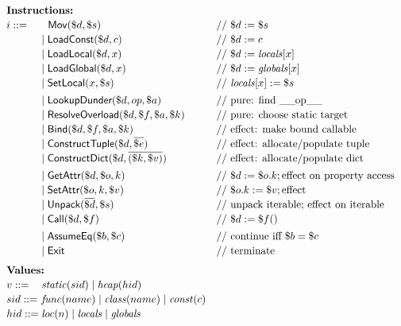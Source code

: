 \begin{figure}[t]
\centering
\[
\renewcommand{\arraystretch}{1.15}
\begin{array}{l@{}ll}
\multicolumn{3}{l}{\textbf{Instructions:}}\\
i ::= \;&\hspace{6pt}\mathsf{Mov}(\$d,\$s) & \text{// } \$d := \$s \\
      &\mid \tLoadConst(\$d,c) & \text{// } \$d := c \\
      &\mid \tLoadLocal(\$d,x) & \text{// } \$d := \mathit{locals}[x] \\
      &\mid \tLoadGlobal(\$d,x) & \text{// } \$d := \mathit{globals}[x] \\
      &\mid \tSetLocal(x,\$s) & \text{// } \mathit{locals}[x] := \$s \\[0.6ex]
      &\mid \tLookupDunder(\$d,op,\$a)  & \text{// pure: find \_\_op\_\_} \\
      &\mid \tResolveOverload(\$d,\$f,\$a,\$k) & \text{// pure: choose static target} \\
      &\mid \tBind(\$d,\$f,\$a,\$k) & \text{// effect: make bound callable} \\
      &\mid \tConstructTuple(\$d,\overline{\$e}) & \text{// effect: allocate/populate tuple} \\
      &\mid \tConstructDict(\$d,\overline{(\$k,\$v)}) & \text{// effect: allocate/populate dict} \\[0.6ex]
      &\mid \tGetAttr(\$d,\$o,k) & \text{// } \$d := \$o.k; \text{effect on property access} \\
      &\mid \tSetAttr(\$o,k,\$v) & \text{// } \$o.k := \$v; \text{effect}\\
      &\mid \tUnpack(\overline{\$d},\$s) & \text{// unpack iterable; effect on iterable} \\
      &\mid \tCall(\$d,\$f) & \text{// } \$d := \$f() \\[0.6ex]
      &\mid \tAssumeEq(\$b,\$c) & \text{// continue iff } \$b = \$c \\
      &\mid \tExit & \text{// terminate} \\[1.1ex]

\multicolumn{3}{l}{\textbf{Values:}}\\
v ::= \;& \mathit{static}(sid) \mid \mathit{heap}(hid) & \\
sid ::= \;& \mathit{func}(name) \mid \mathit{class}(name) \mid \mathit{const}(c) & \\
hid ::= \;& \mathit{loc}(n) \mid \mathit{locals} \mid \mathit{globals} & \\[1.1ex]


\end{array}\]
\end{figure}
